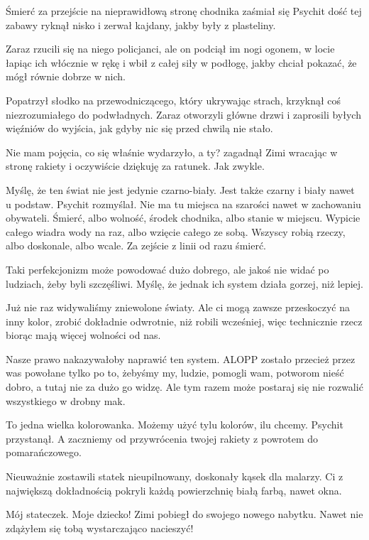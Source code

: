 \ds{} Śmierć za przejście na nieprawidłową stronę chodnika \dm{} zaśmiał się Psychit \dm{} dość tej zabawy \de{} ryknął nisko i zerwał kajdany, jakby były z plasteliny. \de{}

Zaraz rzucili się na niego policjanci, ale on podciął im nogi ogonem, w locie łapiąc ich włócznie w rękę i wbił z całej siły w podłogę, jakby chciał pokazać, że mógł równie dobrze w nich.

Popatrzył słodko na przewodniczącego, który ukrywając strach, krzyknął coś niezrozumiałego do podwładnych.
Zaraz otworzyli główne drzwi i zaprosili byłych więźniów do wyjścia, jak gdyby nic się przed chwilą nie stało.

\divider{}
\ds{} Nie mam pojęcia, co się właśnie wydarzyło, a ty? \dm{} zagadnął Zimi wracając w stronę rakiety \dm{} i oczywiście dziękuję za ratunek. Jak zwykle. \de{}

\ds{} Myślę, że ten świat nie jest jedynie czarno-biały. Jest także czarny i biały nawet u podstaw. \dm{} Psychit rozmyślał. \dm{} 
Nie ma tu miejsca na szarości nawet w zachowaniu obywateli. Śmierć, albo wolność, środek chodnika, albo stanie w miejscu. 
Wypicie całego wiadra wody na raz, albo wzięcie całego ze sobą. Wszyscy robią rzeczy, albo doskonale, albo wcale. Za zejście z linii od razu śmierć.\de{}

\ds{} Taki perfekcjonizm może powodować dużo dobrego, ale jakoś nie widać po ludziach, żeby byli szczęśliwi. Myślę, że jednak ich system działa gorzej, niż lepiej. \de{}

\ds{} Już nie raz widywaliśmy zniewolone światy. Ale ci mogą zawsze przeskoczyć na inny kolor, zrobić dokładnie odwrotnie, niż robili wcześniej, więc technicznie rzecz biorąc mają więcej wolności od nas. \de{}

\ds{} Nasze prawo nakazywałoby naprawić ten system. ALOPP zostało przecież przez was powołane tylko po to, żebyśmy my, ludzie, pomogli wam, potworom nieść dobro, a tutaj nie za dużo go widzę. 
Ale tym razem może postaraj się nie rozwalić wszystkiego w drobny mak. \de{}

\ds{} To jedna wielka kolorowanka. Możemy użyć tylu kolorów, ilu chcemy. \dm{} Psychit przystanął. \dm{} A zaczniemy od przywrócenia twojej rakiety z powrotem do pomarańczowego. \de{}

Nieuważnie zostawili statek nieupilnowany, doskonały kąsek dla malarzy.
Ci z największą dokładnością pokryli każdą powierzchnię białą farbą, nawet okna.

\ds{} Mój stateczek. Moje dziecko! \dm{} Zimi pobiegł do swojego nowego nabytku. \dm{} Nawet nie zdążyłem się tobą wystarczająco nacieszyć! \de{}

